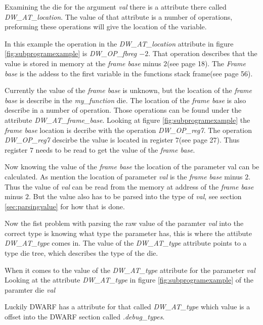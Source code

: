 Examining the \gls{die} for the argument \emph{val} there is a attribute there called \emph{DW\_AT\_location}.
The value of that attribute is a number of operations, preforming these operations will give the location of the variable.


In this example the operation in the \emph{DW\_AT\_location} attribute in figure \ref{fig:subprogramexample} is \emph{DW\_OP\_fbreg $-2$}.
That operation describes that the value is stored in memory at the \emph{frame base} minus $2$(see \cite{dwarf} page 18).
The \emph{Frame base} is the addess to the first variable in the functions stack frame(see \cite{dwarf} page 56).


Currently the value of the \emph{frame base} is unknown, but the location of the \emph{frame base}  is describe in the \emph{my\_function} \gls{die}.
The location of the \emph{frame base} is also describe in a number of operation.
Those operations can be found under the attribute \emph{DW\_AT\_frame\_base}.
Looking at figure \ref{fig:subprogramexample} the \emph{frame base} location is decribe with the operation \emph{DW\_OP\_reg7}.
The operation \emph{DW\_OP\_reg7} descirbe the value is located in register $7$(see \cite{dwarf} page 27).
Thus register $7$ needs to be read to get the value of the \emph{frame base}.


Now knowing the value of the \emph{frame base} the location of the parameter val can be calculated.
As mention the location of parameter \emph{val} is the \emph{frame base} minus $2$.
Thus the value of \emph{val} can be read from the memory at address of the \emph{frame base} minus $2$.
But the value also has to be parsed into the type of \emph{val}, see section \ref{sec:parsingvalue} for how that is done.


 \label{sec:parsingvalue}
Now the fist problem with parsing the raw value of the paramter \emph{val} into the correct type is knowing what type the parameter has, this is where the attibute \emph{DW\_AT\_type} comes in.
The value of the \emph{DW\_AT\_type} attribute points to a type \gls{die} \gls{tree}, which describes the type of the \gls{die}.


When it comes to the value of the \emph{DW\_AT\_type} attribute for the parameter \emph{val}
Looking at the attribute \emph{DW\_AT\_type} in figure \ref{fig:subprogramexample}  of the paramter \gls{die} \emph{val} 


Luckily \gls{DWARF} has a attribute for that called \emph{DW\_AT\_type} which value is a offset into the \gls{DWARF} section called \emph{.debug\_types}.

